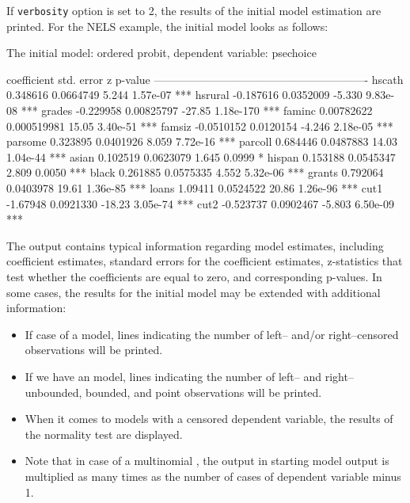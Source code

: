 If \texttt{verbosity} option is set to 2, the results of the
initial model estimation  are printed. For the NELS example,
the initial model looks as follows:
\begin{CodeChunk}\begin{CodeOutput}
The initial model: ordered probit, dependent variable: psechoice

           coefficient   std. error       z       p-value 
----------------------------------------------------------
hscath      0.348616     0.0664749       5.244   1.57e-07  ***
hsrural    -0.187616     0.0352009      -5.330   9.83e-08  ***
grades     -0.229958     0.00825797    -27.85    1.18e-170 ***
faminc      0.00782622   0.000519981    15.05    3.40e-51  ***
famsiz     -0.0510152    0.0120154      -4.246   2.18e-05  ***
parsome     0.323895     0.0401926       8.059   7.72e-16  ***
parcoll     0.684446     0.0487883      14.03    1.04e-44  ***
asian       0.102519     0.0623079       1.645   0.0999    *
hispan      0.153188     0.0545347       2.809   0.0050    ***
black       0.261885     0.0575335       4.552   5.32e-06  ***
grants      0.792064     0.0403978      19.61    1.36e-85  ***
loans       1.09411      0.0524522      20.86    1.26e-96  ***
cut1       -1.67948      0.0921330     -18.23    3.05e-74  ***
cut2       -0.523737     0.0902467      -5.803   6.50e-09  ***
\end{CodeOutput}
\end{CodeChunk}

The output contains typical information regarding model
estimates, including coefficient estimates, standard errors
for the coefficient estimates, z-statistics that test whether
the coefficients are equal to zero, and corresponding p-values.
In some cases, the results for the initial model may be
extended with additional information:

\begin{itemize}
  \item If case of a  model, lines indicating
  	the number of left-- and/or right--censored observations
  	will be printed.
  \item If we have an  model, lines indicating
  	the number of left-- and right--unbounded, bounded, and
  	point observations will be printed.
  \item When it comes to models with a censored dependent
  	variable, the results of the normality test are displayed.
  \item Note that in case of a multinomial ,
  	the output in starting model output is multiplied as many
  	times as the number of cases of dependent variable minus 1.
\end{itemize}

